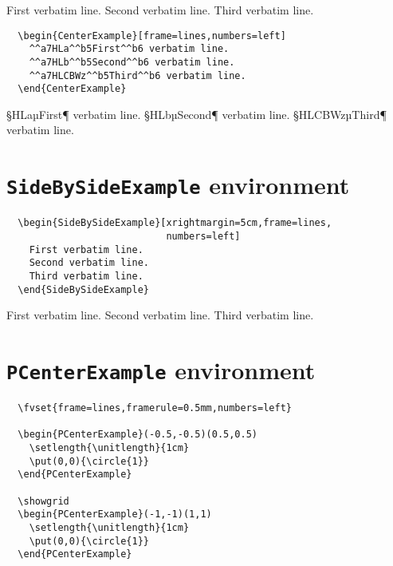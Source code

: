 \documentclass{article}
\newif\ifpstricks
\begin{document}
\begin{CenterExample}[frame=single,numbers=right]
  First verbatim line.
  Second verbatim line.
  Third verbatim line.
\end{CenterExample}

\begin{Verbatim}
  \begin{CenterExample}[frame=lines,numbers=left]
    ^^a7HLa^^b5First^^b6 verbatim line.
    ^^a7HLb^^b5Second^^b6 verbatim line.
    ^^a7HLCBWz^^b5Third^^b6 verbatim line.
  \end{CenterExample}
\end{Verbatim}

\begin{CenterExample}[frame=lines,numbers=left]
  ^^a7HLa^^b5First^^b6 verbatim line.
  ^^a7HLb^^b5Second^^b6 verbatim line.
  ^^a7HLCBWz^^b5Third^^b6 verbatim line.
\end{CenterExample}

\section{\texttt{SideBySideExample} environment}

\begin{Verbatim}
  \begin{SideBySideExample}[xrightmargin=5cm,frame=lines,
                            numbers=left]
    First verbatim line.
    Second verbatim line.
    Third verbatim line.
  \end{SideBySideExample}
\end{Verbatim}

\begin{SideBySideExample}[xrightmargin=5cm,frame=single,numbers=left]
  First verbatim line.
  Second verbatim line.
  Third verbatim line.
\end{SideBySideExample}

\ifpstricks                     %

\section{\texttt{PCenterExample} environment}

\begin{Verbatim}
  \fvset{frame=lines,framerule=0.5mm,numbers=left}

  \begin{PCenterExample}(-0.5,-0.5)(0.5,0.5)
    \setlength{\unitlength}{1cm}
    \put(0,0){\circle{1}}
  \end{PCenterExample}

  \showgrid
  \begin{PCenterExample}(-1,-1)(1,1)
    \setlength{\unitlength}{1cm}
    \put(0,0){\circle{1}}
  \end{PCenterExample}
\end{Verbatim}
\end{document}
